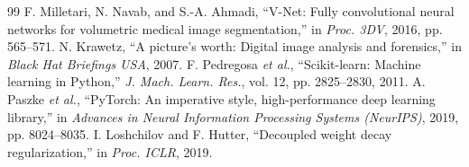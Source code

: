 \documentclass[conference]{IEEEtran}
\begin{document}
\begin{thebibliography}{99}
 F. Milletari, N. Navab, and S.-A. Ahmadi, ``V-Net: Fully convolutional neural networks for volumetric medical image segmentation,'' in \emph{Proc. 3DV}, 2016, pp. 565--571.
 N. Krawetz, ``A picture's worth: Digital image analysis and forensics,'' in \emph{Black Hat Briefings USA}, 2007.
 F. Pedregosa \emph{et al.}, ``Scikit-learn: Machine learning in Python,'' \emph{J. Mach. Learn. Res.}, vol. 12, pp. 2825--2830, 2011.
 A. Paszke \emph{et al.}, ``PyTorch: An imperative style, high-performance deep learning library,'' in \emph{Advances in Neural Information Processing Systems (NeurIPS)}, 2019, pp. 8024--8035.
 I. Loshchilov and F. Hutter, ``Decoupled weight decay regularization,'' in \emph{Proc. ICLR}, 2019.
\end{thebibliography}
\end{document}
